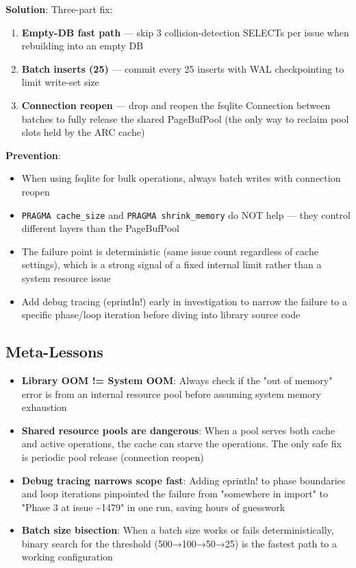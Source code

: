 \documentclass[twocolumn,10pt,letterpaper]{article}
\begin{document}
\textbf{Solution}: Three-part fix:

\begin{enumerate}
\setlength{\itemsep}{0pt}
\setlength{\parskip}{0pt}
  \item \textbf{Empty-DB fast path} — skip 3 collision-detection SELECTs per issue when rebuilding into an empty DB
  \item \textbf{Batch inserts (25)} — commit every 25 inserts with WAL checkpointing to limit write-set size
  \item \textbf{Connection reopen} — drop and reopen the fsqlite Connection between batches to fully release the shared PageBufPool (the only way to reclaim pool slots held by the ARC cache)
\end{enumerate}

\textbf{Prevention}:

\begin{itemize}
\setlength{\itemsep}{0pt}
\setlength{\parskip}{0pt}
  \item When using fsqlite for bulk operations, always batch writes with connection reopen
  \item \colorbox{codebg}{\texttt{PRAGMA cache\_size}} and \colorbox{codebg}{\texttt{PRAGMA shrink\_memory}} do NOT help — they control different layers than the PageBufPool
  \item The failure point is deterministic (same issue count regardless of cache settings), which is a strong signal of a fixed internal limit rather than a system resource issue
  \item Add debug tracing (eprintln!) early in investigation to narrow the failure to a specific phase/loop iteration before diving into library source code
\end{itemize}

\subsection{Meta-Lessons}

\begin{itemize}
\setlength{\itemsep}{0pt}
\setlength{\parskip}{0pt}
  \item \textbf{Library OOM != System OOM}: Always check if the "out of memory" error is from an internal resource pool before assuming system memory exhaustion
  \item \textbf{Shared resource pools are dangerous}: When a pool serves both cache and active operations, the cache can starve the operations. The only safe fix is periodic pool release (connection reopen)
  \item \textbf{Debug tracing narrows scope fast}: Adding eprintln! to phase boundaries and loop iterations pinpointed the failure from "somewhere in import" to "Phase 3 at issue \textasciitilde{}1479" in one run, saving hours of guesswork
  \item \textbf{Batch size bisection}: When a batch size works or fails deterministically, binary search for the threshold (500→100→50→25) is the fastest path to a working configuration
\end{itemize}


\balance
\end{document}

